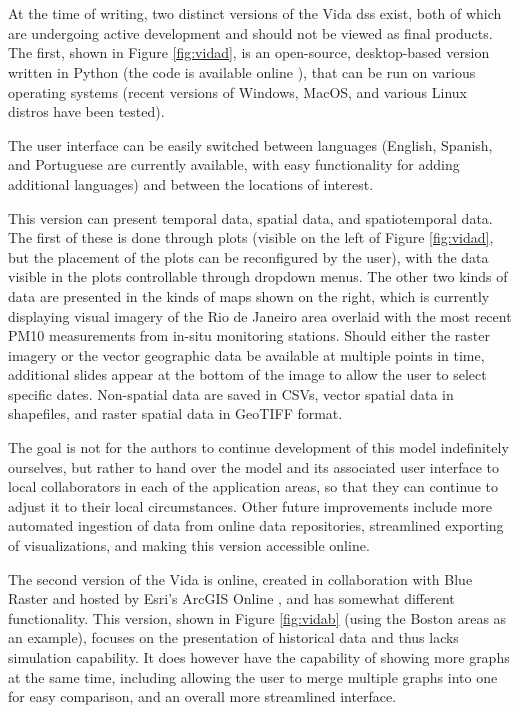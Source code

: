 \section{} \label{sec:vida-dss}

At the time of writing, two distinct versions of the Vida \ac{dss} exist, both of which are undergoing active development and should not be viewed as final products. The first, shown in Figure \ref{fig:vidad}, is an open-source, desktop-based version written in Python (the code is available online \cite{reidMITVidaRepository2021}), that can be run on various operating systems (recent versions of Windows, MacOS, and various Linux distros have been tested). 

The user interface can be easily switched between languages (English, Spanish, and Portuguese are currently available, with easy functionality for adding additional languages) and between the locations of interest.

This version can present temporal data, spatial data, and spatiotemporal data. The first of these is done through plots (visible on the left of Figure \ref{fig:vidad}, but the placement of the plots can be reconfigured by the user), with the data visible in the plots controllable through dropdown menus. The other two kinds of data are presented in the kinds of maps shown on the right, which is currently displaying visual imagery of the Rio de Janeiro area overlaid with the most recent PM10 measurements from in-situ monitoring stations. Should either the raster imagery or the vector geographic data be available at multiple points in time, additional slides appear at the bottom of the image to allow the user to select specific dates. Non-spatial data are saved in CSVs, vector spatial data in shapefiles, and raster spatial data in GeoTIFF format.

The goal is not for the authors to continue development of this model indefinitely ourselves, but rather to hand over the model and its associated user interface to local collaborators in each of the application areas, so that they can continue to adjust it to their local circumstances. Other future improvements include more automated ingestion of data from online data repositories, streamlined exporting of visualizations, and making this version accessible online.

The second version of the Vida is online, created in collaboration with Blue Raster and hosted by Esri's ArcGIS Online \cite{bluerasterMITVidaSupportBoston2021}, and has somewhat different functionality. This version, shown in Figure \ref{fig:vidab} (using the Boston areas as an example), focuses on the presentation of historical data and thus lacks simulation capability. It does however have the capability of showing more graphs at the same time, including allowing the user to merge multiple graphs into one for easy comparison, and an overall more streamlined interface.


